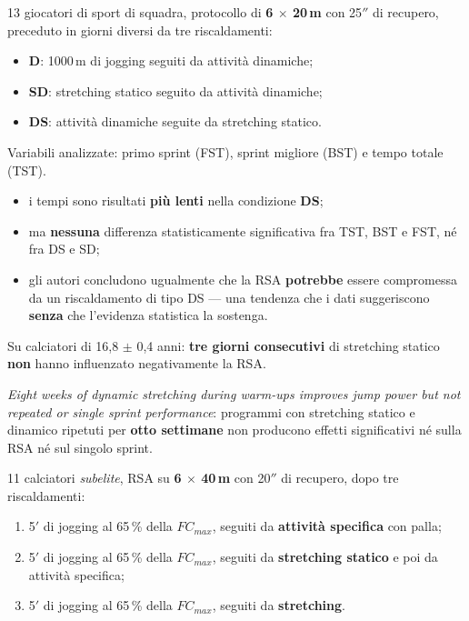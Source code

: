 13 giocatori di sport di squadra, protocollo di \textbf{6 $\times$ 20\,m} con 25$''$ di recupero,
preceduto in giorni diversi da tre riscaldamenti:
\begin{itemize}
  \item \textbf{D}: 1000\,m di jogging seguiti da attività dinamiche;
  \item \textbf{SD}: stretching statico seguito da attività dinamiche;
  \item \textbf{DS}: attività dinamiche seguite da stretching statico.
\end{itemize}
Variabili analizzate: primo sprint (FST), sprint migliore (BST) e tempo totale (TST).

\begin{itemize}
  \item i tempi sono risultati \textbf{più lenti} nella condizione \textbf{DS};
  \item ma \textbf{nessuna} differenza statisticamente significativa fra TST, BST e FST, né fra DS
    e SD;
  \item gli autori concludono ugualmente che la RSA \textbf{potrebbe} essere compromessa da un
    riscaldamento di tipo DS --- una tendenza che i dati suggeriscono \textbf{senza} che
    l'evidenza statistica la sostenga.
\end{itemize}

Su calciatori di 16,8 $\pm$ 0,4 anni: \textbf{tre giorni consecutivi} di stretching statico
\textbf{non} hanno influenzato negativamente la RSA.

\textit{Eight weeks of dynamic stretching during warm-ups improves jump power but not repeated or
single sprint performance}: programmi con stretching statico e dinamico ripetuti per \textbf{otto
settimane} non producono effetti significativi né sulla RSA né sul singolo sprint.

11 calciatori \textit{subelite}, RSA su \textbf{6 $\times$ 40\,m} con 20$''$ di recupero, dopo tre
riscaldamenti:
\begin{enumerate}
  \item 5$'$ di jogging al 65\,\% della $FC_{max}$, seguiti da \textbf{attività specifica} con
    palla;
  \item 5$'$ di jogging al 65\,\% della $FC_{max}$, seguiti da \textbf{stretching statico} e poi
    da attività specifica;
  \item 5$'$ di jogging al 65\,\% della $FC_{max}$, seguiti da \textbf{stretching}.
\end{enumerate}

